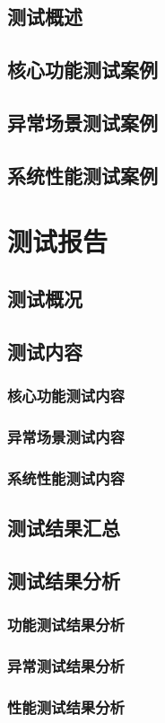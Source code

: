 \documentclass{article}
\begin{document}
\subsection{测试概述}

\subsection{核心功能测试案例}

\subsection{异常场景测试案例}

\subsection{系统性能测试案例}

\section{测试报告}

\subsection{测试概况}
\subsection{测试内容}

\subsubsection{核心功能测试内容}

\subsubsection{异常场景测试内容}

\subsubsection{系统性能测试内容}

\subsection{测试结果汇总}
\subsection{测试结果分析}
\subsubsection{功能测试结果分析}
\subsubsection{异常测试结果分析}
\subsubsection{性能测试结果分析}
\end{document}
